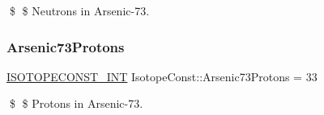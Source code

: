 \$ \$ Neutrons in Arsenic-\/73. \mbox{\label{group___isotope_const-_arsenic-_as73_ga19dd51ca250b1a2b42d004c59ec44149}} 
\subsubsection{\texorpdfstring{Arsenic73\+Protons}{Arsenic73Protons}}
{\footnotesize\ttfamily \mbox{\hyperlink{group___isotope_const-_macros_ga5f18360b3e99483a35c32d789e62621c}{I\+S\+O\+T\+O\+P\+E\+C\+O\+N\+S\+T\+\_\+\+I\+NT}} Isotope\+Const\+::\+Arsenic73\+Protons = 33}

\$ \$ Protons in Arsenic-\/73. 
